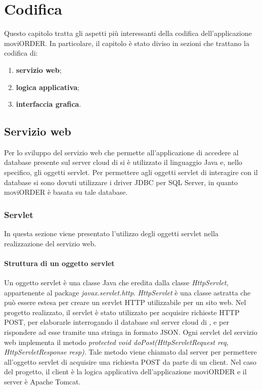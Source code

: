 \chapter{Codifica}

Questo capitolo tratta gli aspetti più interessanti della codifica dell'applicazione moviORDER. In particolare, il capitolo è stato diviso in sezioni che trattano la codifica di:
\begin{enumerate}
	\item \textbf{servizio web};
	\item \textbf{logica applicativa};
	\item \textbf{interfaccia grafica}.
\end{enumerate}

\section{Servizio web}

Per lo sviluppo del servizio web che permette all'applicazione di accedere al database presente sul server cloud di \visione{} si è utilizzato il linguaggio Java e, nello specifico, gli oggetti servlet. Per permettere agli oggetti servlet di interagire con il database si sono dovuti utilizzare i driver JDBC per SQL Server, in quanto moviORDER è basata su tale database. 

\subsection{Servlet}

In questa sezione viene presentato l'utilizzo degli oggetti servlet nella realizzazione del servizio web.

\subsubsection{Struttura di un oggetto servlet}

Un oggetto servlet è una classe Java che eredita dalla classe \textit{HttpServlet}, appartenente al package \textit{javax.servlet.http}. \textit{HttpServlet} è una classe astratta che può essere estesa per creare un servlet HTTP utilizzabile per un sito web. Nel progetto realizzato, il servlet è stato utilizzato per acquisire richieste HTTP POST, per elaborarle interrogando il database sul server cloud di \visione{}, e per rispondere ad esse tramite una stringa in formato JSON. Ogni servlet del servizio web implementa il metodo \textit{protected void doPost(HttpServletRequest req, HttpServletResponse resp)}. Tale metodo viene chiamato dal server per permettere all'oggetto servlet di acquisire una richiesta POST da parte di un client. Nel caso del progetto, il client è la logica applicativa dell'applicazione moviORDER e il server è Apache Tomcat.

